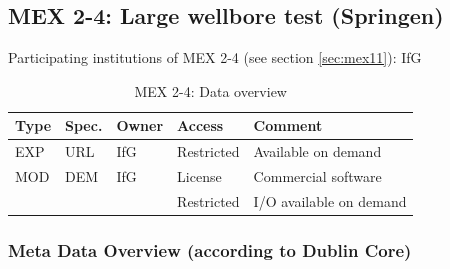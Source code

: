 \subsection{MEX 2-4: Large wellbore test (Springen)}

Participating institutions of MEX 2-4 (see section \ref{sec:mex11}): IfG

\begin{table}[ht!]
\caption{MEX 2-4: Data overview}
\label{tab:dms-mex24-overview}
\small
\begin{tabular}{l|l|l|l|L{4.7cm}}
\hline
{}
Type & Spec. & Owner & Access     & Comment                       \\ 
\hline 
EXP  & URL   & IfG   & Restricted & Available on demand           \\
\hline \hline
MOD  & DEM   & IfG   & License    & Commercial software           \\
     &       &       & Restricted & I/O available on demand       \\
\hline
\end{tabular}
\end{table}
\normalsize

\subsubsection*{Meta Data Overview (according to Dublin Core)}

